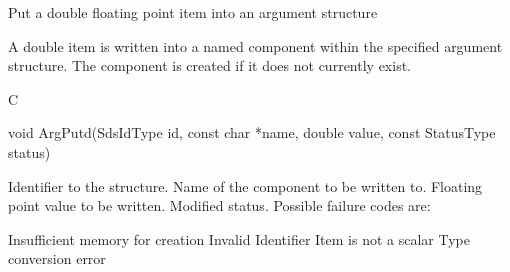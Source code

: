 \begin{manroutinedescription}
      Put a double floating point item into an argument structure

      A double item is written into a named component within the
      specified argument structure. The component is created if it
      does not currently exist.
 
      C

      void ArgPutd(SdsIdType id, const char *name, double value, const %
StatusType {\mantt{*}} status)
 
\begin{manparametertable}
 Identifier to the structure.
 Name of the component to be %
written to.
 Floating point value to be %
written.
 Modified status. Possible %
failure codes are:
\end{manparametertable}
\begin{mantwocolumntable}
Insufficient memory for creation
Invalid Identifier
Item is not a scalar
Type conversion error
\end{mantwocolumntable}
\end{manroutinedescription}
